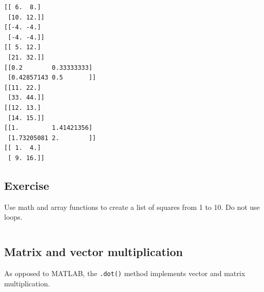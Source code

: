 \documentclass[11pt,a4paper, d]{scrartcl}
\makeatletter
\newcommand{\boxspacing}{\kern\kvtcb@left@rule\kern\kvtcb@boxsep}
\newcommand{\prompt}[4]{
        \ttfamily\llap{{\color{#2}[#3]:\hspace{3pt}#4}}\vspace{-\baselineskip}
    }
\makeatother
\begin{document}
    \begin{Verbatim}[commandchars=\\\{\}]
[[ 6.  8.]
 [10. 12.]]
[[-4. -4.]
 [-4. -4.]]
[[ 5. 12.]
 [21. 32.]]
[[0.2        0.33333333]
 [0.42857143 0.5       ]]
[[11. 22.]
 [33. 44.]]
[[12. 13.]
 [14. 15.]]
[[1.         1.41421356]
 [1.73205081 2.        ]]
[[ 1.  4.]
 [ 9. 16.]]
    \end{Verbatim}

    \hypertarget{exercise}{%
\subsection{Exercise}\label{exercise}}

Use math and array functions to create a list of squares from 1 to 10.
Do not use loops.

    \begin{tcolorbox}[breakable, size=fbox, boxrule=1pt, pad at break*=1mm,colback=cellbackground, colframe=cellborder]
\prompt{In}{incolor}{ }{\boxspacing}
\begin{Verbatim}[commandchars=\\\{\}]

\end{Verbatim}
\end{tcolorbox}

    \hypertarget{matrix-and-vector-multiplication}{%
\subsection{Matrix and vector
multiplication}\label{matrix-and-vector-multiplication}}

As opposed to MATLAB, the \texttt{.dot()} method implements vector and
matrix multiplication.
\end{document}

